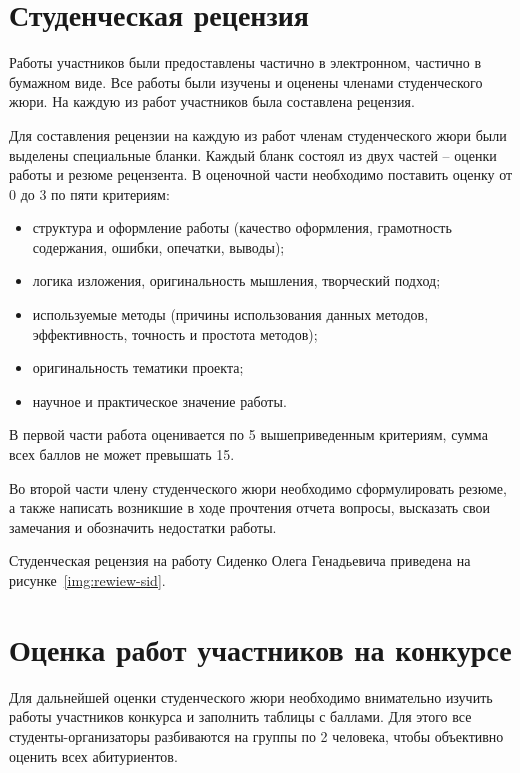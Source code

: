 \section{Студенческая рецензия}

Работы участников были предоставлены частично в электронном, частично в бумажном виде. Все работы были изучены 
и оценены членами студенческого жюри. На каждую из работ участников была составлена рецензия. 

Для составления рецензии на каждую из работ членам студенческого жюри были выделены специальные бланки. 
Каждый бланк состоял из двух частей -- оценки работы и резюме рецензента. В оценочной части необходимо поставить оценку 
от 0 до 3 по пяти критериям:

\begin{itemize}
    \item структура и оформление работы (качество оформления, грамотность содержания, ошибки, опечатки, выводы);
    \item логика изложения, оригинальность мышления, творческий подход;
    \item используемые методы (причины использования данных методов, эффективность, точность и простота методов);
    \item оригинальность тематики проекта;
    \item научное и практическое значение работы.
\end{itemize}

В первой части работа оценивается по 5 вышеприведенным критериям, сумма всех баллов не может превышать 15. 

Во второй части члену студенческого жюри необходимо сформулировать резюме, а также написать возникшие в 
ходе прочтения отчета вопросы, высказать свои замечания и обозначить недостатки работы.

Студенческая рецензия на работу Сиденко Олега Генадьевича приведена на рисунке~\ref{img:rewiew-sid}.
\clearpage
{}

\section{Оценка работ участников на конкурсе}

Для дальнейшей оценки студенческого жюри необходимо внимательно изучить работы участников конкурса и заполнить таблицы с баллами. 
Для этого все студенты-организаторы разбиваются на группы по 2 человека, чтобы объективно оценить всех абитуриентов.

